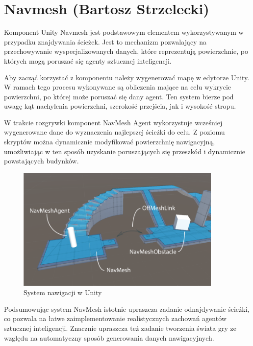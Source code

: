\section{Navmesh (Bartosz Strzelecki)}

Komponent Unity Navmesh jest podstawowym elementem wykorzystywanym w przypadku znajdywania ścieżek.
Jest to mechanizm pozwalający na przechowywanie wyspecjalizowanych danych, które reprezentują
powierzchnie, po których mogą poruszać się agenty sztucznej inteligencji.

Aby zacząć korzystać z komponentu należy wygenerować mapę w edytorze Unity.
W ramach tego procesu wykonywane są obliczenia mające na celu wykrycie powierzchni,
po której może poruszać się dany agent. Ten system bierze pod uwagę kąt nachylenia
powierzchni, szerokość przejścia, jak i wysokość stropu.

W trakcie rozgrywki komponent NavMesh Agent wykorzystuje wcześniej wygenerowane dane
do wyznaczenia najlepszej ścieżki do celu. Z poziomu skryptów można dynamicznie modyfikować powierzchnię
nawigacyjną, umożliwiając w ten sposób uzyskanie poruszających się przeszkód i dynamicznie powstających budynków.

\begin{figure}[h!]
    \centering
    \includegraphics[width=0.9\textwidth]{images/navmesh.png}
    \caption{System nawigacji w Unity}
\end{figure}

Podsumowując system NavMesh istotnie upraszcza zadanie odnajdywanie ścieżki, co pozwala na łatwe zaimplementowanie
realistycznych zachowań agentów sztucznej inteligencji. Znacznie upraszcza też zadanie tworzenia świata gry ze względu na automatyczny
sposób generowania danych nawigacyjnych.

